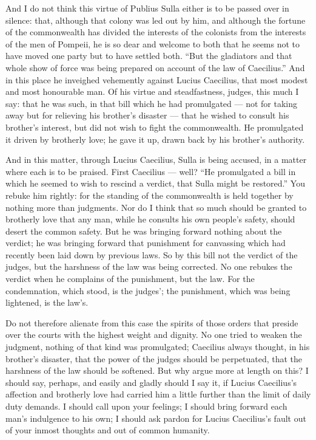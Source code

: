  And I do not think this virtue of Publius Sulla either is to be passed over in silence: that, although that colony was led out by him, and although the fortune of the commonwealth has divided the interests of the colonists from the interests of the men of Pompeii, he is so dear and welcome to both that he seems not to have moved one party but to have settled both. ``But the gladiators and that whole show of force was being prepared on account of the law of Caecilius.'' And in this place he inveighed vehemently against Lucius Caecilius, that most modest and most honourable man. Of his virtue and steadfastness, judges, this much I say: that he was such, in that bill which he had promulgated --- not for taking away but for relieving his brother's disaster --- that he wished to consult his brother's interest, but did not wish to fight the commonwealth. He promulgated it driven by brotherly love; he gave it up, drawn back by his brother's authority.

 And in this matter, through Lucius Caecilius, Sulla is being accused, in a matter where each is to be praised. First Caecilius --- well? ``He promulgated a bill in which he seemed to wish to rescind a verdict, that Sulla might be restored.'' You rebuke him rightly: for the standing of the commonwealth is held together by nothing more than judgments. Nor do I think that so much should be granted to brotherly love that any man, while he consults his own people's safety, should desert the common safety. But he was bringing forward nothing about the verdict; he was bringing forward that punishment for canvassing which had recently been laid down by previous laws. So by this bill not the verdict of the judges, but the harshness of the law was being corrected. No one rebukes the verdict when he complains of the punishment, but the law. For the condemnation, which stood, is the judges'; the punishment, which was being lightened, is the law's.

 Do not therefore alienate from this case the spirits of those orders that preside over the courts with the highest weight and dignity. No one tried to weaken the judgment, nothing of that kind was promulgated; Caecilius always thought, in his brother's disaster, that the power of the judges should be perpetuated, that the harshness of the law should be softened. But why argue more at length on this? I should say, perhaps, and easily and gladly should I say it, if Lucius Caecilius's affection and brotherly love had carried him a little further than the limit of daily duty demands. I should call upon your feelings; I should bring forward each man's indulgence to his own; I should ask pardon for Lucius Caecilius's fault out of your inmost thoughts and out of common humanity.


